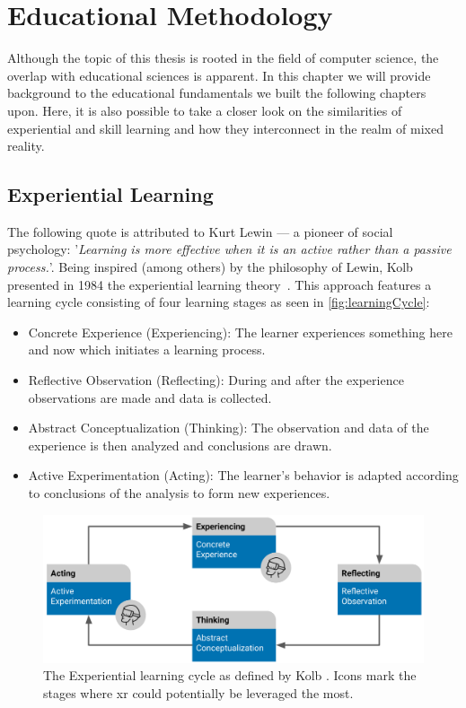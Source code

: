 %
\chapter{Educational Methodology \label{sec:concepts}}
Although the topic of this thesis is rooted in the field of computer science, the overlap with educational sciences is apparent. In this chapter we will provide background to the educational fundamentals we built the following chapters upon. Here, it is also possible to take a closer look on the similarities of experiential and skill learning and how they interconnect in the realm of mixed reality.


\section{Experiential Learning \label{sec:experiential}}
The following quote is attributed to Kurt Lewin --- a pioneer of social psychology: '\emph{Learning is more effective when it is an active rather than a passive process.}'. Being inspired (among others) by the philosophy of Lewin, Kolb presented in 1984 the experiential learning theory~\cite{kolb:1984:experiential}.
This approach features a learning cycle consisting of four learning stages as seen in \autoref{fig:learningCycle}:

\begin{itemize}
    \setlength{\itemsep}{-0.3cm}
    \item Concrete Experience (Experiencing): The learner experiences something here and now which initiates a learning process.
    \item Reflective Observation (Reflecting): During and after the experience observations are made and data is collected.
    \item Abstract Conceptualization (Thinking): The observation and data of the experience is then analyzed and conclusions are drawn.
    \item Active Experimentation (Acting): The learner's behavior is adapted according to conclusions of the analysis to form new experiences. 
\end{itemize}

\begin{figure}[h!bt]
	\centering
	\includegraphics[width=0.9\linewidth]{pictures/ExperientialLearningCycle2.png}
	\captionsetup{labelfont=bf,textfont=it}
	\caption[The Experiential learning cycle as defined by Kolb \cite{kolb:1984:experiential}.]{The Experiential learning cycle as defined by Kolb \cite{kolb:1984:experiential}. Icons mark the stages where \acrshort{xr} could potentially be leveraged the most.\label{fig:learningCycle}}
\end{figure}

